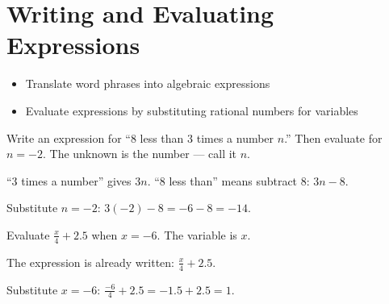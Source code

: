 \section{Writing and Evaluating Expressions}

\begin{stepGoal}
\begin{itemize}
    \item Translate word phrases into algebraic expressions
    \item Evaluate expressions by substituting rational numbers for variables
\end{itemize}
\end{stepGoal}

\begin{stepVocabBox}
\end{stepVocabBox}

\begin{stepsCard}
\end{stepsCard}

\begin{stepExample}{Write an expression for ``$8$ less than $3$ times a number $n$.'' Then evaluate for $n = -2$.}
     The unknown is the number --- call it $n$.

     ``$3$ times a number'' gives $3n$. ``$8$ less than'' means subtract $8$: $3n - 8$.

     Substitute $n = -2$: $3(-2) - 8 = -6 - 8 = -14$.
\end{stepExample}

\begin{stepExample}{Evaluate $\frac{x}{4} + 2.5$ when $x = -6$.}
     The variable is $x$.

     The expression is already written: $\frac{x}{4} + 2.5$.

     Substitute $x = -6$: $\frac{-6}{4} + 2.5 = -1.5 + 2.5 = 1$.
\end{stepExample}

